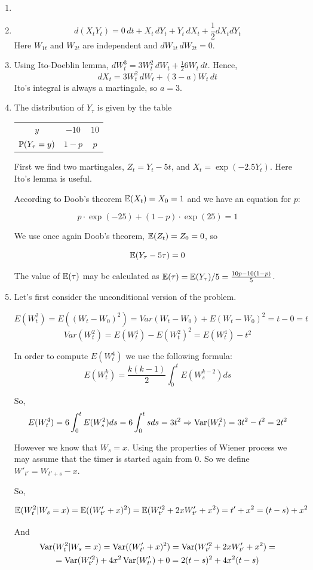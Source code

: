\documentclass[pdftex,12pt,a4paper]{article}
\begin{document}
\begin{enumerate}
\item 
\item 
\[
d(X_t Y_t)=0\, dt + X_t \, dY_t +Y_t \, dX_t + \frac{1}{2} dX_t dY_t 
\]
Here $W_{1t}$ and $W_{2t}$ are independent and $dW_{1t} \, dW_{2t}=0$.


\item Using Ito-Doeblin lemma, $dW_t^3=3W_t^2 \, dW_t + \frac{1}{2}6W_t \, dt$. Hence,
\[
dX_t=3W_t^2 \, dW_t + (3-a)W_t \, dt
\]
Ito's integral is always a martingale, so $a=3$.

\item The distribution of $Y_{\tau}$ is given by the table 

\begin{tabular}{ccc}
$y$ & $-10$ & $10$ \\ 
$\P(Y_{\tau}=y)$ & $1-p$ & $p$ \\ 
\end{tabular} 

First we find two martingales, $Z_t=Y_t-5t$, and $X_t=\exp(-2.5 Y_t)$. Here Ito's lemma is useful.

According to Doob's theorem $\E(X_t)=X_0=1$ and we have an equation for $p$:

\[
p\cdot \exp(-25) + (1-p) \cdot \exp(25) = 1
\]


We use once again Doob's theorem, $\E(Z_t)=Z_0=0$, so

\[
\E(Y_{\tau}-5\tau)=0
\]

The value of $\E(\tau)$ may be calculated as $\E(\tau)=\E(Y_{\tau})/5=\frac{10p-10(1-p)}{5}$. 

\item Let's first consider the unconditional version of the problem.

\[
E(W^{2}_t)=E((W_t-W_0)^{2})=Var(W_t-W_0)+E(W_t-W_0)^{2}=t-0=t
\]
\[
Var(W^{2}_t)=E(W^{4}_t)-E(W^{2}_t)^{2}=E(W^{4}_t)-t^2
\]

In order to compute $E(W^{4}_t)$ we use the following formula:
\[
E(W^{k}_t)=\frac{k(k-1)}{2}\int_{0}^{t}E(W^{k-2}_s)ds
\]

So,
\[
E(W^{4}_t)=6\int_{0}^{t}E(W^{2}_s)ds=6\int_{0}^{t}sds=3t^2 \Rightarrow \Var(W^{2}_t)=3t^2-t^2=2t^2
\]

However we know that $W_s=x$. Using the properties of Wiener process we may assume that the timer is started again from $0$. So we define $W'_{t'}=W_{t'+s}-x$.

So,

\[
\E(W_t^2 | W_s=x) = \E( (W'_{t'}+x)^2 )= \E(W^{\prime 2}_{t'}+2xW'_{t'}+x^2)=t'+x^2=(t-s)+x^2
\]

And
\begin{multline}
\Var(W^{2}_t | W_s=x)=\Var((W'_{t'}+x)^2)=\Var(W^{\prime 2}_{t'} +2xW'_{t'}+x^2)= \\
= \Var(W^{\prime 2}_{t'}) +4x^2 \Var(W'_{t'}) + 0 = 2(t-s)^2+4x^2(t-s)
\end{multline}

\end{enumerate}
\end{document}
